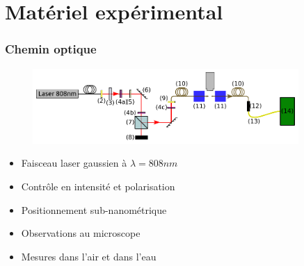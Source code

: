 \documentclass[9pt,a9paper,handout]{beamer}
\begin{document}
\section{Matériel expérimental}
    \begin{frame}
        \frametitle{Chemin optique}
        \begin{figure}\centering
            \includegraphics[width=0.9\textwidth]{Images/Schemas/experience}
        \end{figure}
        \begin{itemize}
            \item Faisceau laser gaussien à $\lambda = 808nm$
            \item Contrôle en intensité et polarisation
            \item Positionnement sub-nanométrique
            \item Observations au microscope
            \item Mesures dans l'air et dans l'eau
        \end{itemize}
    \end{frame}
\end{document}
